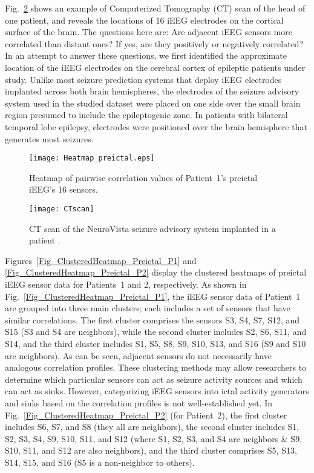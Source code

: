 \documentclass[journal]{IEEEtran}
\begin{document}
Fig.~\ref{Fig_CTscan} shows an example of Computerized Tomography (CT) scan of the head of one patient, and reveals the locations of 16 iEEG electrodes on the cortical surface of the brain. The questions here are: Are adjacent iEEG sensors more correlated than distant ones? If yes, are they positively or negatively correlated? In an attempt to answer these questions, we first identified the approximate location of the iEEG electrodes on the cerebral cortex of epileptic patients under study. Unlike most seizure prediction systems that deploy iEEG electrodes implanted across both brain hemispheres, the electrodes of the seizure advisory system used in the studied dataset were placed on one side over the small brain region presumed to include the epileptogenic zone. In patients with bilateral temporal lobe epilepsy, electrodes were positioned over the brain hemisphere that generates most seizures.



\begin{figure}[!t]\centering
	\texttt{[image: Heatmap\_preictal.eps]}
	\caption{Heatmap of pairwise correlation values of Patient~1’s preictal iEEG's 16 sensors.}
\label{Fig_Heatmap_preictal}
\end{figure}

\begin{figure}[!t]\centering
	\texttt{[image: CTscan]}
	\caption{CT scan of the NeuroVista seizure advisory system implanted in a patient \cite{cook2013prediction}.}
	\label{Fig_CTscan}
\end{figure}


Figures~\ref{Fig_ClusteredHeatmap_Preictal_P1} and \ref{Fig_ClusteredHeatmap_Preictal_P2} display the clustered heatmaps of preictal iEEG sensor data for Patients~1 and 2, respectively. As shown in Fig.~\ref{Fig_ClusteredHeatmap_Preictal_P1}, the iEEG sensor data of Patient~1 are grouped into three main clusters; each includes a set of sensors that have similar correlations. The first cluster comprises the sensors S3, S4, S7, S12, and S15 (S3 and S4 are neighbors), while the second cluster includes S2, S6, S11, and S14, and the third cluster includes S1, S5, S8, S9, S10, S13, and S16 (S9 and S10 are neighbors). As can be seen, adjacent sensors do not necessarily have analogous correlation profiles. These clustering methods may allow researchers to determine which particular sensors can act as seizure activity sources and which can act as sinks. However, categorizing iEEG sensors into ictal activity generators and sinks based on the correlation profiles is not well-established yet. In Fig.~\ref{Fig_ClusteredHeatmap_Preictal_P2} (for Patient~2), 
the first cluster includes S6, S7, and S8 (they all are neighbors), the second cluster includes S1, S2, S3, S4, S9, S10, S11, and S12 (where S1, S2, S3, and S4 are neighbors \& S9, S10, S11, and S12 are also neighbors), and the third cluster comprises S5, S13, S14, S15, and S16 (S5 is a non-neighbor to others). 
\end{document}
